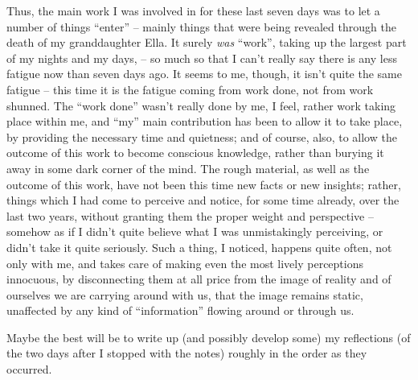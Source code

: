 Thus, the main work I was involved in for these last seven days was to
let a number of things ``enter'' -- mainly things that were being
revealed through the death of my granddaughter Ella. It surely
\emph{was} ``work'', taking up the largest part of my nights and my
days, -- so much so that I can't really say there is any less fatigue
now than seven days ago. It seems to me, though, it isn't quite the
same fatigue -- this time it is the fatigue coming from work done, not
from work shunned. The ``work done'' wasn't really done by me, I feel,
rather work taking place within me, and ``my'' main contribution has
been to allow it to take place, by providing the necessary time and
quietness; and of course, also, to allow the outcome of this work to
become conscious knowledge, rather than burying it away in some dark
corner of the mind. The rough material, as well as the outcome of this
work, have not been this time new facts or new insights; rather,
things which I had come to perceive and notice, for some time already,
over the last two years, without granting them the proper weight and
perspective -- somehow as if I didn't quite believe what I was
unmistakingly perceiving, or didn't take it quite seriously. Such a
thing, I noticed, happens quite often, not only with me, and takes
care of making even the most lively perceptions innocuous, by
disconnecting them at all price from the image of reality and of
ourselves we are carrying around with us, that the image remains
static, unaffected by any kind of ``information'' flowing around or
through us.

\bigbreak

\noindent\hfill{}

\label{sec:117}%
Maybe the best will be to write up (and possibly develop some) my
reflections (of the two days after I stopped with the notes) roughly
in the order as they occurred.

